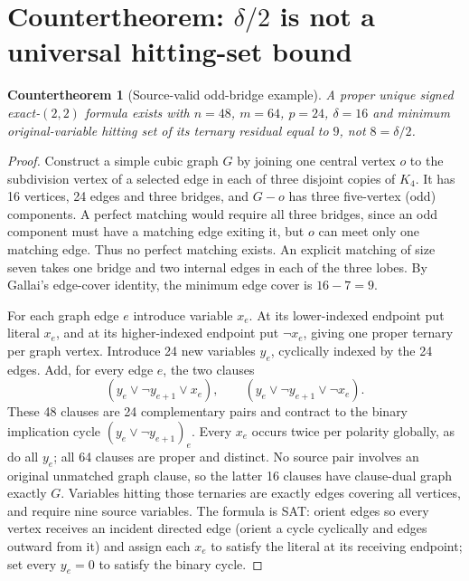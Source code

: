\documentclass[11pt]{article}
\newtheorem{countertheorem}{Countertheorem}
\begin{document}
\section{Countertheorem: $\delta/2$ is not a universal hitting-set bound}
\begin{countertheorem}[Source-valid odd-bridge example]
A proper unique signed exact-$(2,2)$ formula exists with $n=48$, $m=64$, $p=24$, $\delta=16$ and minimum original-variable hitting set of its ternary residual equal to $9$, not $8=\delta/2$.
\end{countertheorem}
\begin{proof}
Construct a simple cubic graph $G$ by joining one central vertex $o$ to the subdivision vertex of a selected edge in each of three disjoint copies of $K_4$. It has 16 vertices, 24 edges and three bridges, and $G-o$ has three five-vertex (odd) components. A perfect matching would require all three bridges, since an odd component must have a matching edge exiting it, but $o$ can meet only one matching edge. Thus no perfect matching exists. An explicit matching of size seven takes one bridge and two internal edges in each of the three lobes. By Gallai's edge-cover identity, the minimum edge cover is $16-7=9$.

For each graph edge $e$ introduce variable $x_e$. At its lower-indexed endpoint put literal $x_e$, and at its higher-indexed endpoint put $\neg x_e$, giving one proper ternary per graph vertex. Introduce 24 new variables $y_e$, cyclically indexed by the 24 edges. Add, for every edge $e$, the two clauses
\[
(y_e\vee\neg y_{e+1}\vee x_e),\qquad
(y_e\vee\neg y_{e+1}\vee\neg x_e).
\]
These 48 clauses are 24 complementary pairs and contract to the binary implication cycle $(y_e\vee\neg y_{e+1})_e$. Every $x_e$ occurs twice per polarity globally, as do all $y_e$; all 64 clauses are proper and distinct. No source pair involves an original unmatched graph clause, so the latter 16 clauses have clause-dual graph exactly $G$. Variables hitting those ternaries are exactly edges covering all vertices, and require nine source variables. The formula is SAT: orient edges so every vertex receives an incident directed edge (orient a cycle cyclically and edges outward from it) and assign each $x_e$ to satisfy the literal at its receiving endpoint; set every $y_e=0$ to satisfy the binary cycle.
\end{proof}
\end{document}
